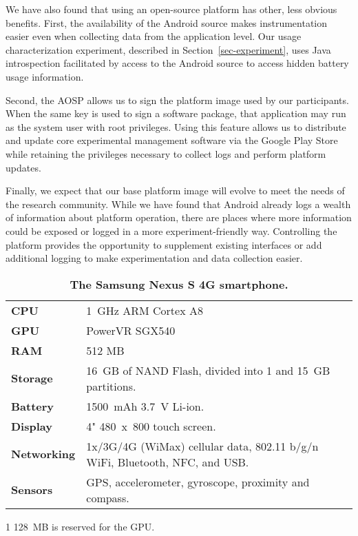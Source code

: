 We have also found that using an open-source platform has other, less obvious
benefits. First, the availability of the Android source makes \PhoneLab{}
instrumentation easier even when collecting data from the application level.
Our usage characterization experiment, described in
Section~\ref{sec-experiment}, uses Java introspection facilitated by access
to the Android source to access hidden battery usage information.

Second, the AOSP allows us to sign the platform image used by our
participants. When the same key is used to sign a software package, that
application may run as the system user with root privileges. Using this
feature allows us to distribute and update core \PhoneLab{} experimental
management software via the Google Play Store while retaining the privileges
necessary to collect logs and perform platform updates.

Finally, we expect that our base \PhoneLab{} platform image will evolve to
meet the needs of the research community. While we have found that Android
already logs a wealth of information about platform operation, there are
places where more information could be exposed or logged in a more
experiment-friendly way. Controlling the platform provides the opportunity to
supplement existing interfaces or add additional logging to make
experimentation and data collection easier.

\begin{table}[t]
\begin{threeparttable}
\begin{tabularx}{\columnwidth}{lX}
\toprule
\textbf{CPU} & 1~GHz ARM Cortex A8 \\
\textbf{GPU} & PowerVR SGX540 \\
\textbf{RAM} & 512 MB\tnote{1} \\
\textbf{Storage} & 16~GB of NAND Flash, divided into 1 and 15~GB partitions.\\
\textbf{Battery} & \num{1500}~mAh 3.7~V Li-ion.\\
\textbf{Display} & 4" 480~x~800 touch screen.\\
\textbf{Networking} & 1x/3G/4G (WiMax) cellular data, 802.11 b/g/n WiFi,
Bluetooth, NFC, and USB.\\
\textbf{Sensors} & GPS, accelerometer, gyroscope, proximity and compass.\\
\bottomrule
\end{tabularx}

{\footnotesize
\begin{tablenotes}
\item [1] 128~MB is reserved for the GPU.
\end{tablenotes}}

\caption{\textbf{The Samsung Nexus S 4G smartphone.}}
\label{table-nexuss4g}
\end{threeparttable}
\end{table}

